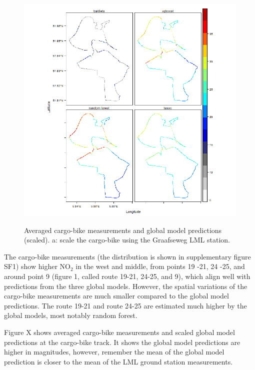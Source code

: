\documentclass{article}
\begin{document}
\begin{figure}[h!]
    \includegraphics[width=\linewidth]{f4.png}
    \label{seperate}
    \caption {Averaged cargo-bike measurements and global model predictions (scaled). a: scale the cargo-bike using the Graafseweg LML station.}
\end{figure}
The cargo-bike measurements (the distribution is shown in supplementary figure SF1) show higher NO$_2$ in the west and middle, from points 19 -21, 24 -25, and around point 9 (figure 1, called route 19-21, 24-25, and 9), which align well with predictions from the three global models. However, the spatial variations of the cargo-bike measurements are much smaller compared to the global model predictions. The route 19-21 and route 24-25 are estimated much higher by the global models, most notably random forest.    
\par
Figure X shows averaged cargo-bike measurements and scaled global model predictions at the cargo-bike track. It shows the global model predictions are higher in magnitudes, however, remember the mean of the global model prediction is closer to the mean of the LML ground station measurements. 
\end{document}
